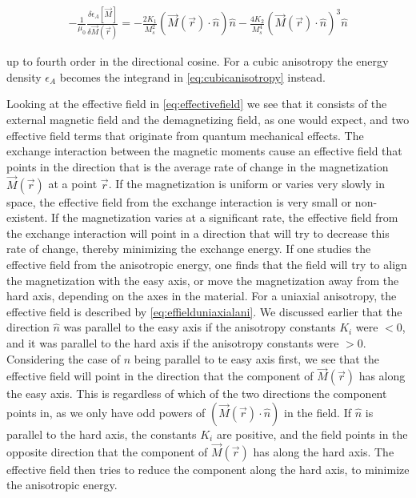 \documentclass[1p]{elsarticle}		%
\begin{document}
\begin{align}
\label{eq:effielduniaxialani}
-\frac{1}{\mu_0}\frac{\delta \epsilon_A[\vec{M}]}{\delta \vec{M}(\vec{r})} = -\frac{2K_1}{M_s^2}(\vec{M}(\vec{r})\cdot\hat{n})\hat{n} - \frac{4K_2}{M_s^4}(\vec{M}(\vec{r})\cdot\hat{n})^3\hat{n}
\end{align}

up to fourth order in the directional cosine. For a cubic anisotropy the energy density $\epsilon_A$ becomes the integrand in \eqref{eq:cubicanisotropy} instead.

Looking at the effective field in \eqref{eq:effectivefield} we see that it consists of the external magnetic field and the demagnetizing field, as one would expect, and two effective field terms that originate from quantum mechanical effects. The exchange interaction between the magnetic moments cause an effective field that points in the direction that is the average rate of change in the magnetization $\vec{M}(\vec{r})$ at a point $\vec{r}$. If the magnetization is uniform or varies very slowly in space, the effective field from the exchange interaction is very small or non-existent. If the magnetization varies at a significant rate, the effective field from the exchange interaction will point in a direction that will try to decrease this rate of change, thereby minimizing the exchange energy. If one studies the effective field from the anisotropic energy, one finds that the field will try to align the magnetization with the easy axis, or move the magnetization away from the hard axis, depending on the axes in the material. For a uniaxial anisotropy, the effective field is described by \eqref{eq:effielduniaxialani}. We discussed earlier that the direction $\hat{n}$ was parallel to the easy axis if the anisotropy constants $K_i$ were $<0$, and it was parallel to the hard axis if the anisotropy constants were $>0$. Considering the case of $\hat{n}$ being parallel to te easy axis first, we see that the effective field will point in the direction that the component of $\vec{M}(\vec{r})$ has along the easy axis. This is regardless of which of the two directions the component points in, as we only have odd powers of $(\vec{M}(\vec{r})\cdot\hat{n})$ in the field. If $\hat{n}$ is parallel to the hard axis, the constants $K_i$ are positive, and the field points in the opposite direction that the component of $\vec{M}(\vec{r})$ has along the hard axis. The effective field then tries to reduce the component along the hard axis, to minimize the anisotropic energy.
\end{document}
